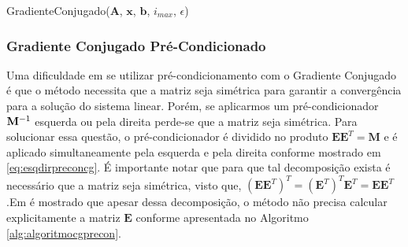 \vspace{1cm}
\begin{algorithm}[H]
\caption{GradienteConjugado($\mathbf{A}$, $\mathbf{x}$, $\mathbf{b}$, $i_{max}$, $\epsilon$)}
\label{alg:algoritmocg}
\end{algorithm}
\vspace{1cm}


\subsubsection{Gradiente Conjugado Pré-Condicionado}


Uma dificuldade em se utilizar pré-condicionamento com o Gradiente Conjugado é que o método necessita que a matriz seja simétrica para garantir a convergência para a solução do sistema linear. Porém, se aplicarmos um pré-condicionador $\mathbf{M}^{-1}$ esquerda ou pela direita perde-se que a matriz seja simétrica. Para solucionar essa questão, o pré-condicionador é dividido no produto $\mathbf{E}\mathbf{E}^T = \mathbf{M}$ e é aplicado simultaneamente pela esquerda e pela direita conforme mostrado em \eqref{eq:esqdirpreconcg}. É importante notar que para que tal decomposição exista é necessário que a matriz seja simétrica, visto que, $(\mathbf{E}\mathbf{E}^T)^T = (\mathbf{E}^T)^T \mathbf{E}^T = \mathbf{E}\mathbf{E}^T$ .Em \citet{Shewchuk94anintroduction} é mostrado que apesar  dessa decomposição, o método não precisa calcular explicitamente a matriz $\mathbf{E}$ conforme apresentada no Algoritmo \ref{alg:algoritmocgprecon}.


